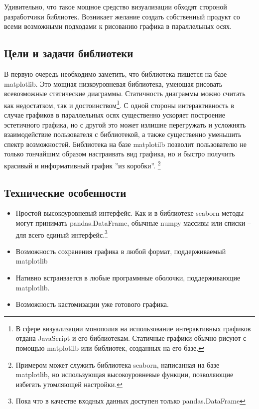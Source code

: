 \documentclass[12pt,fleqn]{article}
\begin{document}
Удивительно, что такое мощное средство визуализации обходят стороной разработчики библиотек. 
Возникает желание создать собственный продукт со всеми возможными подходами к рисованию графика 
в параллельных осях.
\subsection{Цели и задачи библиотеки}
В первую очередь необходимо заметить, что библиотека пишется на базе 
matplotlib. Это мощная низкоуровневая библиотека, умеющая рисовать всевозможные 
статические диаграммы. Статичность диаграммы можно считать как недостатком, так и достоинством\footnote{
В сфере визуализации монополия на использование интерактивных графиков отдана JavaScript и
его библиотекам. Статичные графики обычно рисуют с помощью matplotilb или библиотек, созданных на его базе.}. 
С одной стороны интерактивность в случае графиков в параллельных осях существенно ускоряет построение
эстетичного графика, но с другой это может излишне перегружать и усложнять взаимодействие
пользователя с библиотекой, а также существенно уменьшить спектр возможностей. Библиотека на базе 
matplotilb позволит пользователю не только тончайшим образом настраивать вид графика, но и быстро
получить красивый и информативный график ''из коробки''.
\footnote{Примером может служить библиотека seaborn, написанная на базе matplotlib, но
использующая высокоуровневые функции, позволяющие избегать утомляющей настройки.}


\subsection{Технические особенности}
\begin{itemize}
    \item Простой высокоуровневый интерфейс. Как и в библиотеке seaborn методы могут принимать pandas.DataFrame,
    обычные numpy массивы или списки -- для всего единый интерфейс.\footnote{Пока что в качестве 
    входных данных доступен только pandas.DataFrame}
    \item Возможность сохранения графика в любой формат, поддерживаемый matplotlib
    \item Нативно встраивается в любые программные оболочки, поддерживающие matplotlib.
    \item Возможность кастомизации уже готового графика.
\end{itemize}
\end{document}
